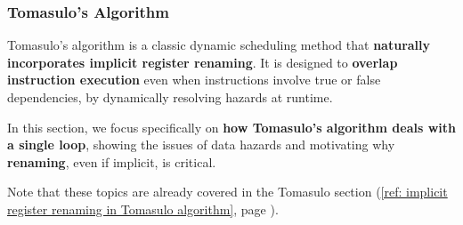 \subsubsection{Tomasulo's Algorithm}

Tomasulo's algorithm is a classic dynamic scheduling method that \textbf{naturally incorporates implicit register renaming}. It is designed to \textbf{overlap instruction execution} even when instructions involve true or false dependencies, by dynamically resolving hazards at runtime.

\highspace
In this section, we focus specifically on \textbf{how Tomasulo's algorithm deals with a single loop}, showing the issues of data hazards and motivating why \textbf{renaming}, even if implicit, is critical.

\highspace
Note that these topics are already covered in the Tomasulo section (\ref{ref: implicit register renaming in Tomasulo algorithm}, page ).

